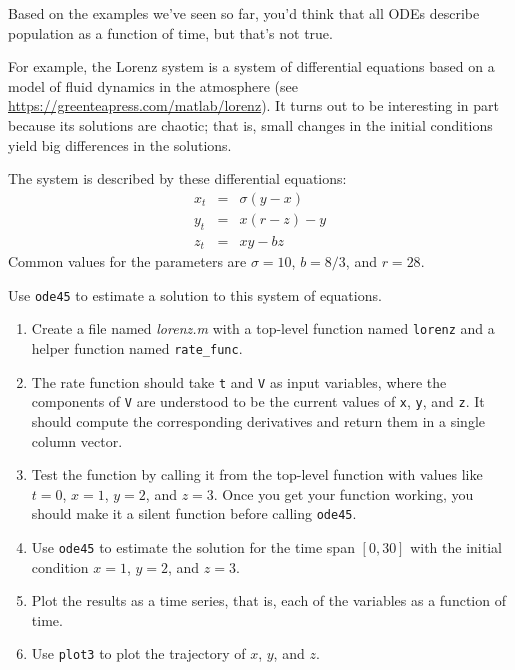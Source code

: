 \begin{ex}


Based on the examples we've seen so far, you'd think that all ODEs describe population as
a function of time, but that's not true.

For example, the Lorenz system is a system of differential equations based on a model of fluid dynamics in the atmosphere
(see \url{https://greenteapress.com/matlab/lorenz}).
It turns out to be interesting in part because its solutions are chaotic; that is, small changes in the initial conditions yield big differences in the solutions.

The system is described by these differential equations:
%
\begin{eqnarray*}
x_t &=& \sigma (y - x)  \\
y_t &=& x (r - z) - y   \\
z_t &=& xy - b z
\end{eqnarray*}
%
Common values for the parameters are $\sigma = 10$, $b = 8/3$, and $r=28$.

Use \lstinline{ode45} to estimate a solution to this system of equations.

\begin{enumerate}

\item Create a file named \emph{lorenz.m} with a top-level function named \lstinline{lorenz} and a helper function named \lstinline{rate_func}.

\item  The rate function should
take \lstinline{t} and \lstinline{V} as input variables, where the components
of \lstinline{V} are understood to be the current values of \lstinline{x},
\lstinline{y}, and \lstinline{z}.  It should compute the corresponding derivatives
and return them in a single column vector.

\item Test the function by calling it from the top-level function with values like $t=0$, $x=1$, $y=2$, and $z=3$.
Once you get your function working, you should make it a silent function before calling \lstinline{ode45}.

\item Use \lstinline{ode45} to estimate the solution for the time span $[0, 30]$
with the initial condition $x=1$, $y=2$, and $z=3$.

\item Plot the results as a time series, that is, each of the variables as a function of time.

\item Use \lstinline{plot3} to plot the trajectory of $x$, $y$, and $z$.

\end{enumerate}


\end{ex}
